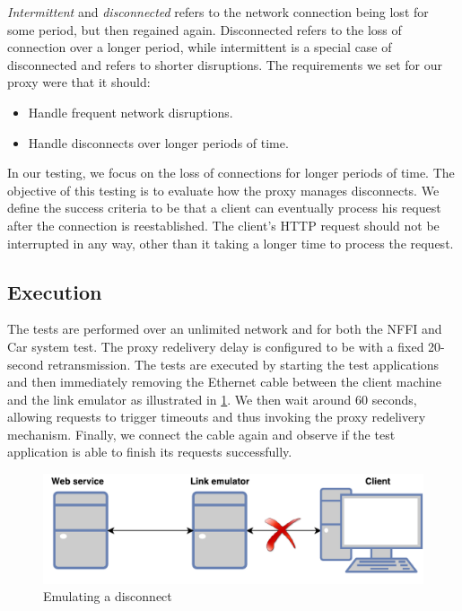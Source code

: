 \textit{Intermittent} and \textit{disconnected} refers to the network connection
being lost for some period, but then regained again. Disconnected refers to the loss
of connection over a longer period, while intermittent is a special case of
disconnected and refers to shorter disruptions. The requirements we set for our
proxy were that it should:

\begin{itemize}

    \item Handle frequent network disruptions.
    \item Handle disconnects over longer periods of time.

\end{itemize}



In our testing, we focus on the loss of connections for longer periods of time.
The objective of this testing is to evaluate how the proxy manages disconnects.
We define the success criteria to be that a client can eventually process his
request after the connection is reestablished. The client's HTTP request should
not be interrupted in any way, other than it taking a longer time to process the
request.

\subsection{Execution}

 The tests are performed over an unlimited network and for both the NFFI and Car
 system test. The proxy redelivery delay is configured to be with a fixed
 20-second retransmission. The tests are executed by starting the test
 applications and then immediately removing the Ethernet cable between the
 client machine and the link emulator as illustrated in
 \cref{figure-testing-disconncted}. We then wait around 60 seconds, allowing
 requests to trigger timeouts and thus invoking the proxy redelivery mechanism.
 Finally, we connect the cable again and observe if the test application is able
 to finish its requests successfully.

 \begin{figure}[h]
 \includegraphics[width=\textwidth]{images/testing_disconnected.pdf}
 \caption{Emulating a disconnect}
 \label{figure-testing-disconncted}
 \end{figure}


